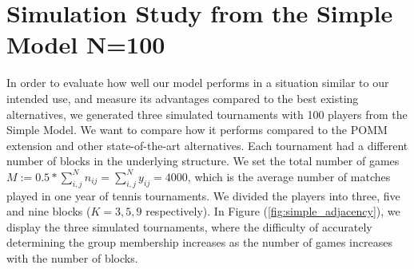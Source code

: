 \documentclass[11pt]{amsart}
\begin{document}
\begin{comment}
\item Prediction error: making prediction on the match score between two players is also possible within this framework. Once we have obtained the MCMC samples, we can retrieve the posterior predictive distribution.

Let us assume $i^\star$ is a new player . The posterior predictive is:
\begin{align}
p(y_{i^\star j}| \textbf{Y}) &= \int p(z| \{ \textbf{Y}\setminus y_{i^\star} \})  \cdot p(y_{i^\star j} | z ) dz \\
&\approx \frac{1}{T} \sum_{t = 1}^{T} \sum_{z_i=1}^{K}  p(y_{i^\star j}| z_j^{(t)}) \\
&=  \frac{1}{T} \sum_{t = 1}^{T} \sum_{z_{i^\star} =1}^{K}  p_{z_{i^\star}, z_j^{(t)}}^{y_{i^\star j} } \cdot (1-p_{z_{i^\star}, z_j^{(t)}})^{n_{i^\star j} -  y_{i^\star j}} \quad \quad \text{for }y_{i^\star j} = 0,\ldots, n_{i^\star j} \\
\end{align} 
where $z_j^{(t)} \sim p(z|Y)$
\end{itemize}
\end{comment}

\clearpage

\section{Simulation Study from the Simple Model N=100}

In order to evaluate how well our model performs in a situation similar to our intended use, and measure its advantages compared to the best existing alternatives, we generated three simulated tournaments with 100 players from the Simple Model. We want to compare how it performs compared to the POMM extension and other state-of-the-art alternatives. Each tournament had a different number of blocks in the underlying structure. We set the total number of games $M := 0.5* \sum_{i,j}^N n_{ij}= \sum_{i,j}^N y_{ij} = 4000$, which is the average number of matches played in one year of tennis tournaments. We divided the players into three, five and nine blocks ($K = 3,5,9$ respectively). In Figure (\ref{fig:simple_adjacency}), we display the three simulated tournaments, where the difficulty of accurately determining the group membership increases as the number of games increases with the number of blocks.
\end{document}
